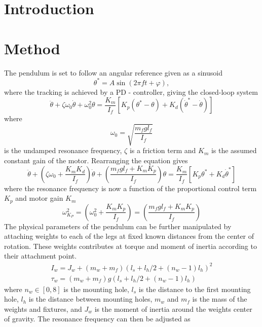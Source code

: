 \documentclass[12pt]{article}
\begin{document}
\section{Introduction}

\section{Method}

The pendulum is set to follow an angular reference given as a sinusoid 
\begin{equation}
\theta^* = A\sin(2\pi f t + \varphi),
\end{equation}
where the tracking is achieved by a PD - controller, giving the closed-loop system
\begin{equation}
\ddot{\theta} + \zeta\omega_0\dot{\theta} + \omega_0^2\theta = \frac{K_m}{I_f}\left[K_p(\theta^*-\theta) + K_d(\dot{\theta}^*-\dot{\theta})\right]
\end{equation}
where
\begin{equation}
\omega_0 = \sqrt{\frac{m_fgl_f}{I_f}}
\end{equation}
is the undamped resonance frequency, $\zeta$ is a friction term and $K_m$ is the assumed constant gain of the motor. Rearranging the equation gives
\begin{equation}
\ddot{\theta} + \left(\zeta\omega_0 + \frac{K_mK_d}{I_f}\right)\dot{\theta} + \left(\frac{m_fgl_f+K_mK_p}{I_f}\right)\theta = \frac{K_m}{I_f}\left[K_p\theta^*+ K_d\dot{\theta}^*\right]
\end{equation}
where the resonance frequency is now a function of the proportional control term $K_p$ and motor gain $K_m$
\begin{equation}
\omega_{K_P}^2 = \left(\omega_0^2 + \frac{K_mK_p}{I_f}\right) = \left(\frac{m_fgl_f+K_mK_p}{I_f}\right)
\end{equation}
The physical parameters of the pendulum can be further manipulated by attaching weights to each of the legs at fixed known distances from the center of rotation. These weights contributes at torque and moment of inertia according to their attachment point. 
\begin{equation}
\begin{split}
I_w = J_w + (m_w + m_f)(l_s + l_h/2 + (n_w-1)l_h)^2 \\
\tau_w = (m_w + m_f)g(l_s + l_h/2 + (n_w-1)l_h)
\end{split}
\end{equation}
where $n_w \in [0,8]$ is the mounting hole, $l_s$ is the distance to the first mounting hole, $l_h$ is the distance between mounting holes, $m_w$ and $m_f$ is the mass of the weights and fixtures, and $J_w$ is the moment of inertia around the weights center of gravity. The resonance frequency can then be adjusted as 
\end{document}
